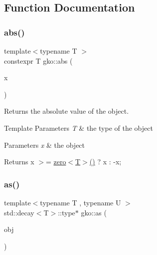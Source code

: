 \subsection{Function Documentation}
\mbox{\label{namespacegko_a57797fc0a00fd4b7ff34ca4bfc84bc51}} 
\subsubsection{\texorpdfstring{abs()}{abs()}}
{\footnotesize\ttfamily template$<$typename T $>$ \\
constexpr T gko\+::abs (\begin{DoxyParamCaption}\item[{const T \&}]{x }\end{DoxyParamCaption})\hspace{0.3cm}{\ttfamily [inline]}}



Returns the absolute value of the object. 


\begin{DoxyTemplParams}{Template Parameters}
{\em T} & the type of the object\\
\hline
\end{DoxyTemplParams}

\begin{DoxyParams}{Parameters}
{\em x} & the object\\
\hline
\end{DoxyParams}
\begin{DoxyReturn}{Returns}
x $>$= \hyperlink{namespacegko_a70dbe01ff95c7b953d3d737424c6feb5}{zero$<$\+T$>$()} ? x \+: -\/x; 
\end{DoxyReturn}
\mbox{\label{namespacegko_a73ce7e87aec389b5210630bb617b4baa}} 
\subsubsection{\texorpdfstring{as()}{as()}\hspace{0.1cm}{\footnotesize\ttfamily [1/2]}}
{\footnotesize\ttfamily template$<$typename T , typename U $>$ \\
std\+::decay$<$T$>$\+::type$\ast$ gko\+::as (\begin{DoxyParamCaption}\item[{U $\ast$}]{obj }\end{DoxyParamCaption})\hspace{0.3cm}{\ttfamily [inline]}}



